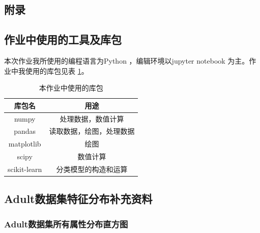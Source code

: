 \documentclass[12pt,a4paper]{article}
\theoremstyle{definition}
\begin{document}
\newpage
\begin{appendix}
	\section{附录}
	\subsection{作业中使用的工具及库包}
	\label{apd:tools}
	本次作业我所使用的编程语言为Python \cite{python}，编辑环境以jupyter notebook \cite{notebook} 为主。作业中我使用的库包见表 \ref{tab:import}。
	
	\begin{table}[H]
		\renewcommand\arraystretch{1.35}
		\caption{本作业中使用的库包}
		\label{tab:import}
		\centering
		
		\begin{tabular}{c|c}
			\centering
			库包名 &  用途 \\
			\hline
	
			numpy \cite{numpy} & 处理数据，数值计算 \\
			pandas \cite{pandas} & 读取数据，绘图，处理数据 \\
			matplotlib \cite{matplotlib} & 绘图 \\
			scipy \cite{scipy} & 数值计算 \\
			scikit-learn \cite{sklearn} & 分类模型的构造和运算 \\
	
		\end{tabular}
	\end{table}
	
	\subsection{Adult数据集特征分布补充资料}
	
	\subsubsection{Adult数据集所有属性分布直方图}
	\label{apd:attri}
	

\end{appendix}
\end{document}
